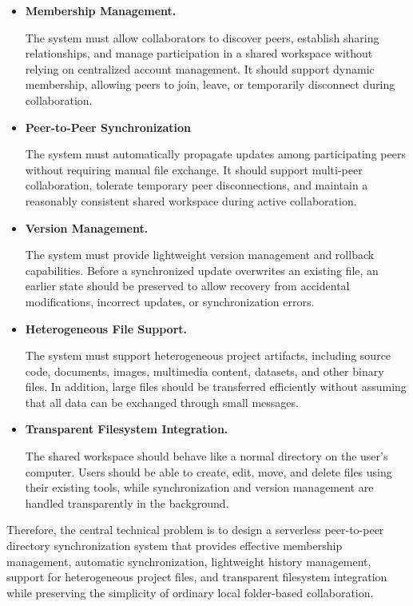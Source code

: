 \begin{itemize}

\item \textbf{Membership Management.}

The system must allow collaborators to discover peers,
establish sharing relationships, and manage participation in
a shared workspace without relying on centralized account
management. It should support dynamic membership, allowing
peers to join, leave, or temporarily disconnect during
collaboration.

\item \textbf{Peer-to-Peer Synchronization}

The system must automatically propagate updates among
participating peers without requiring manual file exchange.
It should support multi-peer collaboration, tolerate
temporary peer disconnections, and maintain a reasonably
consistent shared workspace during active collaboration.

\item \textbf{Version Management.}

The system must provide lightweight version management and
rollback capabilities. Before a synchronized update
overwrites an existing file, an earlier state should be
preserved to allow recovery from accidental modifications,
incorrect updates, or synchronization errors.

\item \textbf{Heterogeneous File Support.}

The system must support heterogeneous project artifacts,
including source code, documents, images, multimedia content,
datasets, and other binary files. In addition, large files
should be transferred efficiently without assuming that all
data can be exchanged through small messages.

\item \textbf{Transparent Filesystem Integration.}

The shared workspace should behave like a normal directory on
the user's computer. Users should be able to create, edit,
move, and delete files using their existing tools, while
synchronization and version management are handled
transparently in the background.

\end{itemize}

Therefore, the central technical problem is to design a
serverless peer-to-peer directory synchronization system that
provides effective membership management, automatic
synchronization, lightweight history management, support for
heterogeneous project files, and transparent filesystem
integration while preserving the simplicity of ordinary local
folder-based collaboration.
